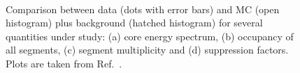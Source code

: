 \begin{figure}[htbp]
\centering
{}%
\\
%
%
\caption{Comparison between data (dots with error bars) and MC (open
histogram) plus background (hatched histogram) for several quantities
under study: (a) core energy spectrum, (b) occupancy of all segments,
(c) segment multiplicity and (d) suppression factors. Plots are taken
from Ref.~\cite{Pid07}.}
\label{fig:ph:mc}
\end{figure}

